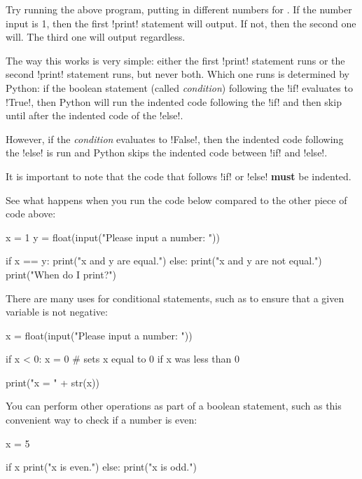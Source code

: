 \documentclass[11pt]{cselabheader}
\begin{document}
Try running the above program, putting in different numbers for
.  If the number input is 1, then the first \pythoninline!print!
statement will output. If not, then the second one will. The third one will
output regardless.

The way this works is very simple: either the first \pythoninline!print!
statement runs or the second \pythoninline!print! statement runs, but never
both. Which one runs is determined by Python: if the boolean statement (called
\emph{condition}) following the \pythoninline!if! evaluates to
\pythoninline!True!, then Python will run the indented code following the
\pythoninline!if! and then skip until after the indented code of the
\pythoninline!else!.

However, if the \emph{condition} evaluates to \pythoninline!False!, then the
indented code following the \pythoninline!else! is run and Python skips the
indented code between \pythoninline!if! and \pythoninline!else!.

It is important to note that the code that follows \pythoninline!if! or
\pythoninline!else! \textbf{must} be indented.

See what happens when you run the code below compared to the other piece of code
above:

\begin{python3code}
x = 1
y = float(input("Please input a number: "))

if x == y:
    print("x and y are equal.")
else:
    print("x and y are not equal.")
    print("When do I print?")
\end{python3code}

There are many uses for conditional statements, such as to ensure that a given
variable is not negative:

\begin{python3code}
x = float(input("Please input a number: "))

if x < 0:
    x = 0 # sets x equal to 0 if x was less than 0

print("x = " + str(x))
\end{python3code}

You can perform other operations as part of a boolean statement, such as this
convenient way to check if a number is even:

\begin{python3code}
x = 5

if x %
    print("x is even.")
else:
    print("x is odd.")
\end{python3code}
\end{document}
